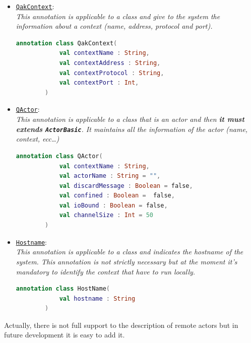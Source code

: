 \begin{itemize}
	\item \href{https://github.com/LM-96/QA-Extensions/blob/main/it.unibo.qakactor/src/main/kotlin/annotations/QakContext.kt}{\textcolor{YellowOrange}{\underline{\texttt{QakContext}}}}:\\
	\textit{This annotation is applicable to a class and give to the system the information about a context (name, address, protocol and port).}
	\begin{lstlisting}[numbers=none,language=Kotlin]
		annotation class QakContext(
			val contextName : String,
			val contextAddress : String,
			val contextProtocol : String,
			val contextPort : Int,
		)
	\end{lstlisting}

	\item \href{https://github.com/LM-96/QA-Extensions/blob/main/it.unibo.qakactor/src/main/kotlin/annotations/QActor.kt}{\textcolor{YellowOrange}{\underline{\texttt{QActor}}}}:\\
	\textit{This annotation is applicable to a class that is an actor and then \textbf{it must extends \texttt{ActorBasic}}. It maintains all the information of the actor (name, context, ecc\dots)}
	\begin{lstlisting}[numbers=none,language=Kotlin]
		annotation class QActor(
			val contextName : String,
			val actorName : String = "",
			val discardMessage : Boolean = false,
			val confined : Boolean =  false,
			val ioBound : Boolean = false,
			val channelSize : Int = 50
		)
	\end{lstlisting}

	\item \href{https://github.com/LM-96/QA-Extensions/blob/main/it.unibo.qakactor/src/main/kotlin/annotations/QakContext.kt}{\textcolor{YellowOrange}{\underline{\texttt{Hostname}}}}:\\
	\textit{This annotation is applicable to a class and indicates the hostname of the system. This annotation is not strictly necessary but at the moment it's mandatory to identify the context that have to run locally.}
	\begin{lstlisting}[numbers=none,language=Kotlin]
		annotation class HostName(
			val hostname : String
		)
	\end{lstlisting}
\end{itemize}

Actually, there is not full support to the description of remote actors but in future development it is easy to add it.

